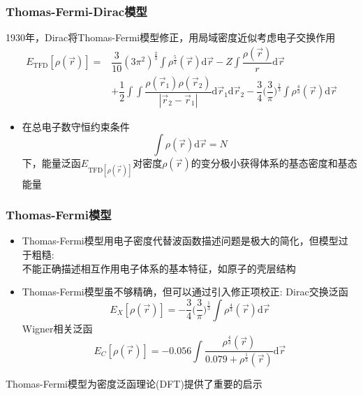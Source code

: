 \documentclass[cjk,slidestop,compress,mathserif,blue]{beamer}
\begin{document}
\frame
{
	\frametitle{\textrm{Thomas-Fermi-Dirac}模型} 
	1930年，\textrm{Dirac}将\textrm{Thomas-Fermi}模型修正，用局域密度近似考虑电子交换作用
			\begin{displaymath}
				\begin{aligned}
					E_{\mathrm{TFD}}[\rho(\vec r)]=&\dfrac3{10}(3\pi^2)^{\frac23}\int\rho^{\frac53}(\vec r)\mathrm{d}\vec r-Z\int\dfrac{\rho(\vec r)}{r}\mathrm{d}\vec r\\
					&+\dfrac12\int\int\dfrac{\rho(\vec r_1)\rho(\vec r_2)}{|\vec r_2-\vec r_1|}\mathrm{d}\vec r_1\mathrm{d}\vec r_2-\dfrac34\bigg(\dfrac3{\pi}\bigg)^{\frac13}\int\rho^{\frac43}(\vec r)\mathrm{d}\vec r
				\end{aligned}
			\end{displaymath}
			\begin{itemize}
				\item 在总电子数守恒约束条件
					$$\int\rho(\vec r)\mathrm{d}\vec r=N$$
					下，能量泛函$E_{\mathrm{TFD}[\rho(\vec r)]}$对密度$\rho(\vec r)$的变分极小获得体系的基态密度和基态能量
			\end{itemize}
}

\frame
{
	\frametitle{\textrm{Thomas-Fermi}模型}
	\begin{itemize}
		\item \textrm{Thomas-Fermi}模型用电子密度代替波函数描述问题是极大的简化，但模型过于粗糙:\\
			不能正确描述相互作用电子体系的基本特征，如原子的壳层结构
		\item \textrm{Thomas-Fermi}模型虽不够精确，但可以通过引入修正项校正:
			\textrm{Dirac}交换泛函 $$E_X[\rho(\vec r)]=-\dfrac34\bigg(\dfrac3{\pi}\bigg)^{\frac13}\int\rho^{\frac43}(\vec r)\mathrm{d}\vec r$$
			\textrm{Wigner}相关泛函 $$E_C[\rho(\vec r)]=-0.056\int\dfrac{\rho^{\frac43}(\vec r)}{0.079+\rho^{\frac13}(\vec r)}\mathrm{d}\vec r$$
	\end{itemize}
	\textrm{Thomas-Fermi}模型为密度泛函理论\textrm{(DFT)}提供了重要的启示
}
\end{document}
